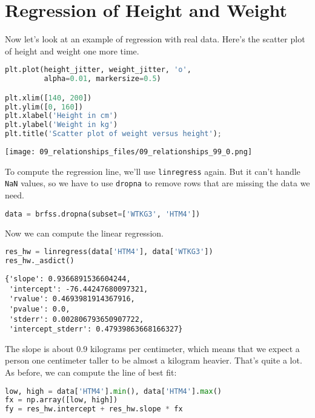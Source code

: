 \section{Regression of Height and
Weight}\label{regression-of-height-and-weight}

Now let's look at an example of regression with real data. Here's the
scatter plot of height and weight one more time.

\begin{lstlisting}[language=Python,style=source]
plt.plot(height_jitter, weight_jitter, 'o',
         alpha=0.01, markersize=0.5)

plt.xlim([140, 200])
plt.ylim([0, 160])
plt.xlabel('Height in cm')
plt.ylabel('Weight in kg')
plt.title('Scatter plot of weight versus height');
\end{lstlisting}

\begin{center}
\texttt{[image: 09\_relationships\_files/09\_relationships\_99\_0.png]}
\end{center}

To compute the regression line, we'll use
\passthrough{\lstinline!linregress!} again. But it can't handle
\passthrough{\lstinline!NaN!} values, so we have to use
\passthrough{\lstinline!dropna!} to remove rows that are missing the
data we need.

\begin{lstlisting}[language=Python,style=source]
data = brfss.dropna(subset=['WTKG3', 'HTM4'])
\end{lstlisting}

Now we can compute the linear regression.

\begin{lstlisting}[language=Python,style=source]
res_hw = linregress(data['HTM4'], data['WTKG3'])
res_hw._asdict()
\end{lstlisting}

\begin{lstlisting}[style=output]
{'slope': 0.9366891536604244,
 'intercept': -76.44247680097321,
 'rvalue': 0.4693981914367916,
 'pvalue': 0.0,
 'stderr': 0.002806793650907722,
 'intercept_stderr': 0.47939863668166327}
\end{lstlisting}

The slope is about 0.9 kilograms per centimeter, which means that we
expect a person one centimeter taller to be almost a kilogram heavier.
That's quite a lot. As before, we can compute the line of best fit:

\begin{lstlisting}[language=Python,style=source]
low, high = data['HTM4'].min(), data['HTM4'].max()
fx = np.array([low, high])
fy = res_hw.intercept + res_hw.slope * fx
\end{lstlisting}

